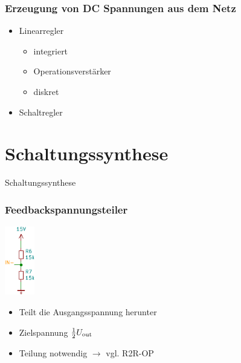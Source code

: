 \documentclass[aspectratio=32]{beamer}
\begin{document}
\begin{frame}
  \frametitle{Erzeugung von DC Spannungen aus dem Netz}
  \begin{itemize}
    \item Linearregler 
    \begin{itemize}
      \item integriert
      \item Operationsverstärker
      \item diskret
    \end{itemize}
    \item Schaltregler
  \end{itemize}
\end{frame}

\section{Schaltungssynthese}
{
  \logo{}
  \begin{frame}
    \centering
    \Large{Schaltungssynthese}
  \end{frame}
}

\begin{frame}
  \frametitle{Feedbackspannungsteiler}
  \centering
  \includegraphics[height=3cm]{../common/Simulation/feedbackteiler.pdf}
  \begin{itemize}
    \item Teilt die Ausgangsspannung herunter
    \item Zielspannung $\frac{1}{2}U_{\rm out}$ 
    \item Teilung notwendig $\rightarrow$ vgl. R2R-OP
  \end{itemize}
\end{frame}
\end{document}
